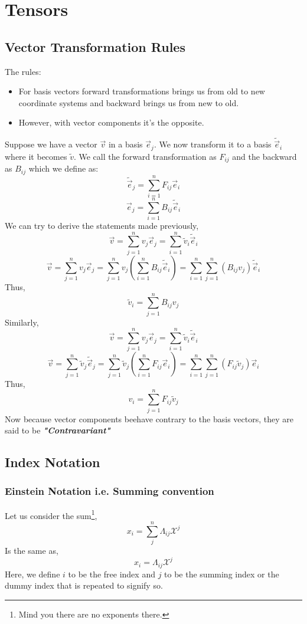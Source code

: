 \section{Tensors}
\subsection{Vector Transformation Rules}
The rules:
\begin{itemize}
	\item For basis vectors forward transformations brings us from old to new coordinate systems and backward brings us from new to old.
	\item However, with vector components it's the opposite.\\
\end{itemize}

Suppose we have a vector $\vec{v}$ in a basis $\vec{e}_j$. We now transform it to a basis $\tilde{\vec{e}}_i$ where it becomes $\tilde{v}$. We call the forward transformation as $F_{ij}$ and the backward as $B_{ij}$ which we define as:
$$\tilde{\vec{e}}_j = \sum_{i = 1}^{n} F_{ij} \vec{e}_i$$
$$\vec{e}_j = \sum_{i = 1}^{n} B_{ij} \tilde{\vec{e}}_i$$
We can try to derive the statements made previously,
$$\vec{v} = \sum_{j = 1}^{n} v_{j}\vec{e}_j = \sum_{i = 1}^{n} \tilde{v}_{i}\tilde{\vec{e}}_i$$
$$\vec{v} = \sum_{j = 1}^{n} v_{j}\vec{e}_j = \sum_{j = 1}^{n} {v}_{j}(\sum_{i=1}^{n} B_{ij} \tilde{\vec{e}}_i) =  \sum_{i = 1}^{n} \sum_{j = 1}^{n} (B_{ij} {v}_{j}) \tilde{\vec{e}}_i$$
Thus,
\begin{equation}
	\tilde{v}_i = \sum_{j = 1}^{n} B_{ij} {v}_{j}
\end{equation}
Similarly,
$$\vec{v} = \sum_{j = 1}^{n} v_{j}\vec{e}_j = \sum_{i = 1}^{n} \tilde{v}_{i}\tilde{\vec{e}}_i$$
$$\vec{v} = \sum_{j = 1}^{n} \tilde{v}_{j}\tilde{\vec{e}}_j = \sum_{j = 1}^{n} \tilde{v}_{j}(\sum_{i = 1}^{n} F_{ij} \vec{e}_i) =  \sum_{i = 1}^{n} \sum_{j = 1}^{n} (F_{ij} \tilde{v}_{j}) {\vec{e}}_i$$
Thus,
\begin{equation}
	{v}_i = \sum_{j = 1}^{n} F_{ij} \tilde{v}_{j}
\end{equation}
Now because vector components beehave contrary to the basis vectors, they are said to be \textit{\textbf{"Contravariant"}}
\subsection{Index Notation}
\subsubsection{Einstein Notation i.e. Summing convention}
Let us consider the sum\footnote{Mind you there are no exponents there.},
$$x_{i} = \sum_{j}^{n}\Lambda_{ij}\mathcal{X}^{j}$$
Is the same as,
$$x_{i} = \Lambda_{ij}\mathcal{X}^{j}$$ 
Here, we define $i$ to be the free index and $j$ to be the summing index or the dummy index that is repeated to signify so.
